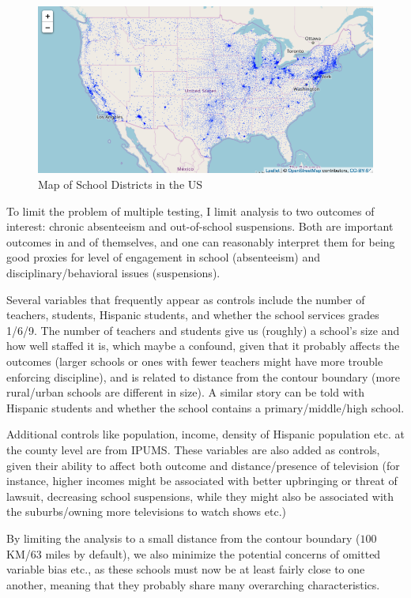 \documentclass{article}
\begin{document}
\begin{figure}[!hbtp]
\centering
\caption{Map of School Districts in the US}
\includegraphics[width=12cm]{../analysis/Output/img/LEAMap.png}
\end{figure} 

To limit the problem of multiple testing, I limit analysis to two outcomes of interest: chronic absenteeism and out-of-school suspensions. Both are important outcomes in and of themselves, and one can reasonably interpret them for being good proxies for level of engagement in school (absenteeism) and disciplinary/behavioral issues (suspensions).

Several variables that frequently appear as controls include the number of teachers, students, Hispanic students, and whether the school services grades 1/6/9. The number of teachers and students give us (roughly) a school's size and how well staffed it is, which maybe a confound, given that it probably affects the outcomes (larger schools or ones with fewer teachers might have more trouble enforcing discipline), and is related to distance from the contour boundary (more rural/urban schools are different in size). A similar story can be told with Hispanic students and whether the school contains a primary/middle/high school.

Additional controls like population, income, density of Hispanic population etc. at the county level are from IPUMS. These variables are also added as controls, given their ability to affect both outcome and distance/presence of television (for instance, higher incomes might be associated with better upbringing or threat of lawsuit, decreasing school suspensions, while they might also be associated with the suburbs/owning more televisions to watch shows etc.) 

By limiting the analysis to a small distance from the contour boundary ($100$ KM/63 miles by default), we also minimize the potential concerns of omitted variable bias etc., as these schools must now be at least fairly close to one another, meaning that they probably share many overarching characteristics.
\end{document}

